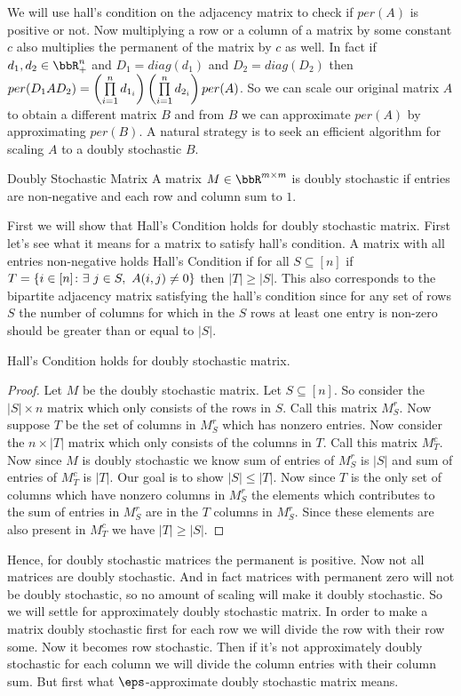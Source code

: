 We will use hall's condition on the adjacency matrix to check if $per(A)$ is positive or not. Now multiplying a row or a column of a matrix by some constant $c$ also multiplies the permanent of the matrix by $c$ as well. In fact if $d_1,d_2\in\bbR_+^n$ and $D_1=diag(d_1)$ and $D_2=diag(D_2)$  then $per(D_1AD_2)=\left(\prod\limits_{i=1}^nd_{1_i}\right)\left(\prod\limits_{i=1}^nd_{2_i}\right)per(A)$. So we can scale our original matrix $A$ to obtain a different matrix $B$ and from $B$ we can approximate $per(A)$ by approximating $per(B)$. A natural strategy is to seek an efficient algorithm for scaling $A$ to a doubly stochastic $B$.
\begin{Definition}{Doubly Stochastic Matrix}{}
	A matrix $M\in\bbR^{m\times m}$ is doubly stochastic if entries are non-negative and each row and column sum to $1$.
\end{Definition}

First we will show that Hall's Condition holds for doubly stochastic matrix. First let's see what it means for a matrix to satisfy hall's condition. A matrix with all entries non-negative holds Hall's Condition if for all $S\subseteq [n]$ if $T=\{i\in [n]\colon \exs\ j\in S,\ A(i,j)\neq 0\}$ then $|T|\geq |S|$. This also corresponds to the bipartite adjacency matrix satisfying the hall's condition since for any set of rows $S$ the number of columns for which in the $S$ rows at least one entry is non-zero should be greater than or equal to $|S|$.
\begin{lemma}{}{}
	Hall's Condition holds for doubly stochastic matrix.
\end{lemma}
\begin{proof}
	Let $M$ be the doubly stochastic matrix. Let $S\subseteq [n]$. So consider the $|S|\times n$ matrix which only consists of the rows in $S$. Call this matrix $M_S^r$. Now suppose $T$ be the set of columns in $M_S^r$ which has nonzero entries. Now consider the $n\times |T|$ matrix which only consists of the columns in $T$. Call this matrix $M_T^c$. Now since $M$ is doubly stochastic we know sum of entries of $M_S^r$ is $|S|$ and sum of entries of $M_T^c$ is $|T|$. Our goal is to show $|S|\leq |T|$. Now since $T$ is the only set of columns which have nonzero columns in $M_S^r$ the elements which contributes to the sum of entries in $M_S^r$ are in the  $T$ columns in $M_S^r$. Since these elements are also present in $M_T^c$ we have $|T|\geq |S|$.
\end{proof}

Hence, for doubly stochastic matrices the permanent is positive. Now not all matrices are doubly stochastic. And in fact matrices with permanent zero will not be doubly stochastic, so no amount of scaling will make it doubly stochastic. So we will settle for approximately doubly stochastic matrix. In order to make a matrix doubly stochastic first for each row we will divide the row with their row some. Now it becomes row stochastic. Then if it's not approximately doubly stochastic for each column we will divide the column entries with their column sum. But first what $\eps$-approximate doubly stochastic matrix means.

